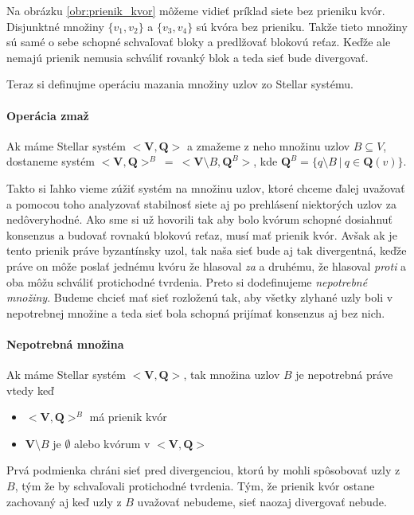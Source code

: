 \vspace{4mm}
Na obrázku \ref{obr:prienik_kvor} môžeme vidieť príklad siete bez prieniku kvór.
Disjunktné množiny $\{v_1, v_2\}$ a $\{v_3, v_4\}$ sú kvóra bez prieniku. Takže
tieto množiny sú samé o sebe schopné schvaľovať bloky a predlžovať blokovú
reťaz.
Keďže ale nemajú prienik nemusia schváliť rovanký blok a teda sieť bude
divergovať.

Teraz si definujme operáciu mazania množiny uzlov zo Stellar systému.

\paragraph {Operácia zmaž} Ak máme Stellar systém $<\textbf{V},\textbf{Q}>$ a
zmažeme z neho množinu uzlov $B \subseteq V$, dostaneme systém $<\textbf{V},
\textbf{Q}>^B \: = \: <\textbf{V} \setminus B,\textbf{Q}^B>$, kde $\textbf{Q}^B
= \{q \setminus B \: | \: q \in \textbf{Q}(v)\}$.

\vspace{4mm}
Takto si ľahko vieme zúžiť systém na množinu uzlov, ktoré chceme ďalej uvažovať
a pomocou toho analyzovať stabilnosť siete aj po prehlásení niektorých uzlov
za nedôveryhodné. Ako sme si už hovorili tak aby bolo kvórum schopné dosiahnuť
konsenzus a budovať rovnakú blokovú reťaz, musí mať prienik kvór. Avšak ak je
tento prienik práve byzantínsky uzol, tak naša sieť bude aj tak divergentná,
keďže práve on môže poslať jednému kvóru že hlasoval \textit{za} a druhému,
že hlasoval \textit{proti} a oba môžu schváliť protichodné tvrdenia.
Preto si dodefinujeme \textit{nepotrebné množiny}.
Budeme chcieť mať sieť rozloženú tak, aby všetky zlyhané uzly boli v
nepotrebnej množine a teda sieť bola schopná prijímať konsenzus aj bez nich.

\pagebreak

\paragraph {Nepotrebná množina} Ak máme Stellar systém $<\textbf{V},
\textbf{Q}>$, tak množina uzlov $B$ je nepotrebná práve vtedy keď
\begin{itemize}
\item  $<\textbf{V}, \textbf{Q}>^B$ má prienik kvór
\item  $\textbf{V} \setminus B$ je $\pmb{\emptyset}$ alebo kvórum v $<
\textbf{V}, \textbf{Q}>$
\end{itemize}

Prvá podmienka chráni sieť pred divergenciou, ktorú by mohli spôsobovať uzly z
$B$, tým že by schvaľovali protichodné tvrdenia. Tým, že prienik kvór ostane
zachovaný aj keď uzly z $B$ uvažovať nebudeme, sieť naozaj divergovať nebude.

